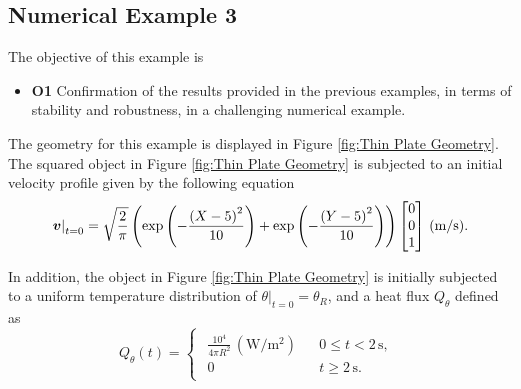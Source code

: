 \subsection{Numerical Example 3}

The objective of this example is

\begin{itemize}
	\item \textbf{O1}   Confirmation of the results provided in the previous examples, in terms of stability and robustness, in a challenging numerical example.
	
\end{itemize}	

The geometry for this example is displayed in Figure \ref{fig:Thin Plate Geometry}. The squared object in Figure \ref{fig:Thin Plate Geometry} is subjected to an initial velocity profile given by the following equation
%
\begin{equation}\label{eqn:initial velocity}
\left.\boldsymbol{v}\right\vert_{t=0}=\sqrt{\frac{2}{\pi}}\left(\exp{\left(-\frac{\left(X-5\right)^2}{10}\right)} + \exp{\left(-\frac{\left(Y-5\right)^2}{10}\right)}\right)\begin{bmatrix}
0 \\  0 \\ 1
\end{bmatrix}\,(\text{m/s}).
\end{equation}

In addition, the object in Figure \eqref{fig:Thin Plate Geometry} is initially subjected to a uniform temperature distribution of $\left.\theta\right\vert_{t=0}=\theta_R$, and a heat flux $Q_{\theta}$ defined as
%
\begin{equation}\label{eqn:Heat Flux thing plate}
Q_{\theta}(t)=\left\{\begin{array}{ccc}
\begin{aligned}
\frac{10^4}{4\pi R^2}\,(\text{W}/\text{m}^2)&&0\leq t<2\,\text{s} ,\\
0  &&t\geq 2\,\text{s}. 
\end{aligned} 
\end{array}\right.
\end{equation}


